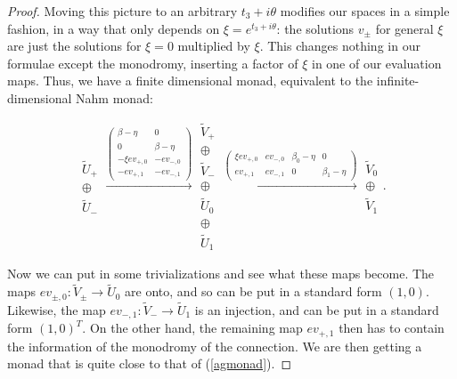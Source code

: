 \documentclass[12pt]{article}
\theoremstyle{definition}
\theoremstyle{remark}
\numberwithin{theorem}{section}
\begin{document}
\begin{proof}
Moving this picture to an arbitrary $t_3+i\theta$ modifies our spaces in a simple fashion, in a way that only depends on $\xi = e^{t_3+i\theta}$: the solutions $v_\pm$ for general $\xi$ are just the solutions for $\xi= 0$ multiplied by $\xi$. This changes nothing in our formulae except the monodromy, inserting a factor of $\xi$ in one of our evaluation maps. Thus, we have  a finite dimensional 
monad, equivalent to the infinite-dimensional Nahm monad: 
 
$$  \begin{matrix} \widetilde U_+ \\ \oplus\\  \widetilde  U_-\end{matrix}\xrightarrow{\begin{pmatrix}\beta -\eta&0\\ 0&\beta -\eta \\ -\xi ev_{+,0}&-ev_{-,0}\\   -ev_{+,1}&-ev_{-,1}\end{pmatrix}}  \begin{matrix}\widetilde  V_{+}\\ \oplus\\ \widetilde  V_{-}\\ \oplus\\\widetilde   U_{0}\\ \oplus\\\widetilde     U_{1} \end{matrix} \xrightarrow{\begin{pmatrix}\xi ev_{+,0}& ev_{-,0}& \beta_0-\eta&0\\
  ev_{+,1}&ev_{-,1}&0&\beta_1-\eta\end{pmatrix}}
 \begin{matrix}  \widetilde  V_{ 0} \\ \oplus\\ \widetilde  V_{ 1} \end{matrix}. $$
 
 Now we can put in some trivializations and see what these maps become. The maps $ev_{\pm, 0}:  \widetilde V_\pm\rightarrow  \widetilde  U_0$ are onto, and so can be put in a standard form $(1,0)$. Likewise,  the map 
 $ev_{-,1}:  \widetilde V_-\rightarrow  \widetilde  U_1$ is an injection, and can be put in a standard form $(1,0)^T$. On the other hand, the remaining map  $ev_{+,1}$ then has to contain the information of the monodromy of the connection. We are then getting a monad that is quite close to that of (\ref{agmonad}).
  

\end{proof}
\end{document}
